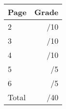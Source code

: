 \documentclass[12pt]{article}
\newcommand{\skipline}{\vspace{12pt}}
\begin{document}
\begin{table}[hbt]
\begin{center}
\begin{tabular}{|l|r|} \hline
Page&Grade\\
\hline \hline
\cline{1-2} 2 & \enspace\enspace\enspace\enspace\enspace\enspace/10\\
\cline{1-2} 3 & \enspace\enspace\enspace\enspace\enspace\enspace/10\\
\cline{1-2} 4 & \enspace\enspace\enspace\enspace\enspace\enspace/10\\
\cline{1-2} 5 & \enspace\enspace\enspace\enspace\enspace\enspace/5\\
\cline{1-2} 6 & \enspace\enspace\enspace\enspace\enspace\enspace/5\\
\cline{1-2} Total & \enspace\enspace\enspace\enspace\enspace\enspace/40\\
\hline
\end{tabular}

\skipline

\skipline

\skipline


\end{center}
\end{table}
\newpage
\end{document}
